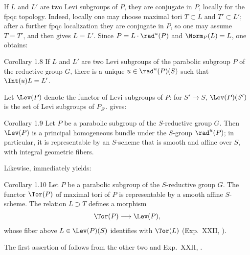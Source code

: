If \(L\) and \(L'\) are two Levi subgroups of \(P\), they are conjugate in
\(P\), locally for the fpqc topology.  Indeed, locally one may choose
maximal tori \(T\subset L\) and \(T'\subset L'\); after a further fpqc
localization they are conjugate in \(P\), so one may assume \(T=T'\), and
then  gives \(L=L'\).  Since
\(P=L\cdot\rad^u(P)\) and \(\Norm_P(L)=L\), one obtains:

\begin{sgastatement}{Corollary 1.8}
If \(L\) and \(L'\) are two Levi subgroups of the parabolic subgroup \(P\)
of the reductive group \(G\), there is a unique \(u\in\rad^u(P)(S)\) such
that \(\Int(u)L=L'\).
\end{sgastatement}

Let \(\Lev(P)\) denote the functor of Levi subgroups of \(P\): for
\(S'\to S\), \(\Lev(P)(S')\) is the set of Levi subgroups of \(P_{S'}\).
 gives:

\begin{sgastatement}{Corollary 1.9}
Let \(P\) be a parabolic subgroup of the \(S\)-reductive group
\(G\).  Then \(\Lev(P)\) is a principal homogeneous bundle under the
\(S\)-group \(\rad^u(P)\); in particular, it is representable by an
\(S\)-scheme that is smooth and affine over \(S\), with integral geometric
fibers.
\end{sgastatement}

Likewise,  immediately yields:

\begin{sgastatement}{Corollary 1.10}
Let \(P\) be a parabolic subgroup of the \(S\)-reductive group
\(G\).  The functor \(\Tor(P)\) of maximal tori of \(P\) is representable
by a smooth affine \(S\)-scheme.  The relation \(L\supset T\) defines a
morphism
\[
 \Tor(P)\longrightarrow\Lev(P),
\]
whose fiber above \(L\in\Lev(P)(S)\) identifies with \(\Tor(L)\)
\textup{(Exp.\ XXII, )}.
\end{sgastatement}

The first assertion of  follows from the other two and Exp.\ XXII,
.

